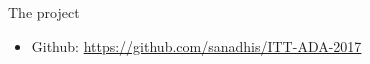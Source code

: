 \documentclass[final]{beamer}
\newlength{\onecolwid}
\begin{document}
\begin{frame}
\begin{columns}[t]
\begin{column}{\onecolwid}











\begin{block}{The project}

\begin{itemize}
\item Github: \href{https://github.com/sanadhis/ITT-ADA-2017}{https://github.com/sanadhis/ITT-ADA-2017}
\end{itemize}

\end{block}



\end{column}
\end{columns}
\end{frame}
\end{document}
